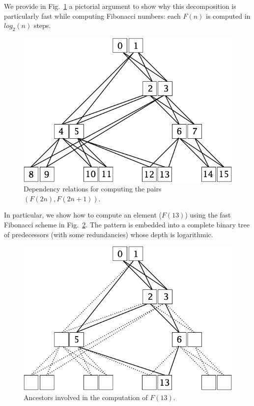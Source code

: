 We provide in Fig.~\ref{fig:fastFibo} a pictorial argument to show why this decomposition 
is particularly fast while computing Fibonacci numbers:
each $F(n)$ is computed in $log_2 (n)$ steps.
\begin{figure}[h]
\begin{center}
        \includegraphics[scale=0.4]{FiguresMaths/FiboFast.png}
        \caption{Dependency relations for computing the pairs $(F(2n),F(2n+1))$.}
                \label{fig:fastFibo}
\end{center}
\end{figure}
In particular, we show how to compute an element ($F(13)$) using the fast Fibonacci scheme in Fig.~\ref{fig:fastFibo13}.
The pattern is embedded into a complete binary tree of predecessors (with some redundancies)
whose depth is logarithmic.
\begin{figure}[h]
\begin{center}
        \includegraphics[scale=0.4]{FiguresMaths/FiboFast13.png}
        \caption{Ancestors involved in the computation of $F(13)$. }
        \label{fig:fastFibo13}
\end{center}
\end{figure}

